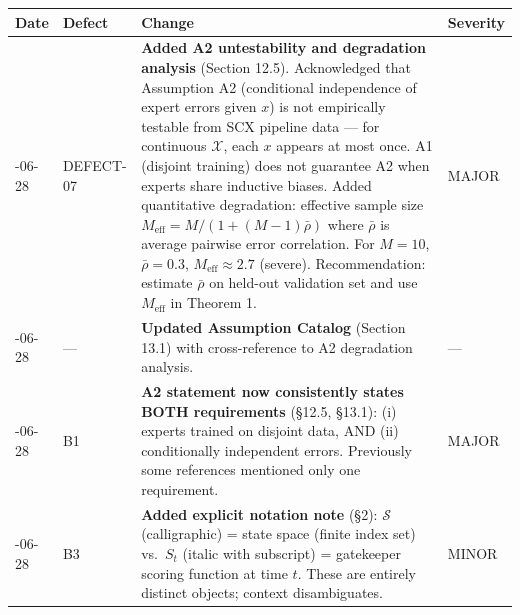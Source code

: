 \documentclass[
  12pt,
]{article}
\begin{document}
\begin{longtable}[]{@{}
  >{\raggedright\arraybackslash}p{}
  >{\raggedright\arraybackslash}p{}
  >{\raggedright\arraybackslash}p{}
  >{\raggedright\arraybackslash}p{}@{}}
\toprule\noalign{}
\begin{minipage}[b]{\linewidth}\raggedright
Date
\end{minipage} & \begin{minipage}[b]{\linewidth}\raggedright
Defect
\end{minipage} & \begin{minipage}[b]{\linewidth}\raggedright
Change
\end{minipage} & \begin{minipage}[b]{\linewidth}\raggedright
Severity
\end{minipage} \\
\midrule\noalign{}
\endhead
\bottomrule\noalign{}
\endlastfoot
2026-06-28 & DEFECT-07 & \textbf{Added A2 untestability and degradation
analysis} (Section 12.5). Acknowledged that Assumption A2 (conditional
independence of expert errors given \(x\)) is not empirically testable
from SCX pipeline data --- for continuous \(\mathcal{X}\), each \(x\)
appears at most once. A1 (disjoint training) does not guarantee A2 when
experts share inductive biases. Added quantitative degradation:
effective sample size \(M_{\text{eff}} = M/(1+(M-1)\bar{\rho})\) where
\(\bar{\rho}\) is average pairwise error correlation. For \(M=10\),
\(\bar{\rho}=0.3\), \(M_{\text{eff}} \approx 2.7\) (severe).
Recommendation: estimate \(\bar{\rho}\) on held-out validation set and
use \(M_{\text{eff}}\) in Theorem 1. & MAJOR \\
2026-06-28 & --- & \textbf{Updated Assumption Catalog} (Section 13.1)
with cross-reference to A2 degradation analysis. & --- \\
2026-06-28 & B1 & \textbf{A2 statement now consistently states BOTH
requirements} (§12.5, §13.1): (i) experts trained on disjoint data, AND
(ii) conditionally independent errors. Previously some references
mentioned only one requirement. & MAJOR \\
2026-06-28 & B3 & \textbf{Added explicit notation note} (§2):
\(\mathcal{S}\) (calligraphic) = state space (finite index set)
vs.~\(S_t\) (italic with subscript) = gatekeeper scoring function at
time \(t\). These are entirely distinct objects; context disambiguates.
& MINOR \\
\end{longtable}
\end{document}
